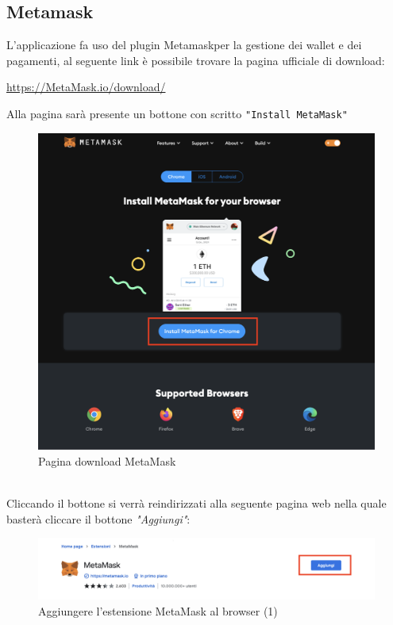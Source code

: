 \subsection{Metamask} \label{subsection:Metamask}

L'applicazione fa uso del plugin Metamask\glo per la gestione dei wallet e dei pagamenti, 
al seguente link è possibile trovare la pagina ufficiale di download:
 \begin{center}
     \url{https://MetaMask.io/download/}
 \end{center}
 Alla pagina sarà presente un bottone con scritto \texttt{"Install MetaMask"}
 \begin{figure}[H]
    \centering
    \includegraphics[scale=0.3]{immagini/install-MetaMask.png}
    \caption{Pagina download MetaMask}
\end{figure}
\textbf{}\\
Cliccando il bottone si verrà reindirizzati alla seguente pagina web nella quale basterà cliccare il bottone \textit{"Aggiungi"}:
\begin{figure}[H]
    \centering
    \includegraphics[scale=0.3]{immagini/MetaMaskExtensionPage.png}
    \caption{Aggiungere l'estensione MetaMask al browser (1)}
\end{figure}
